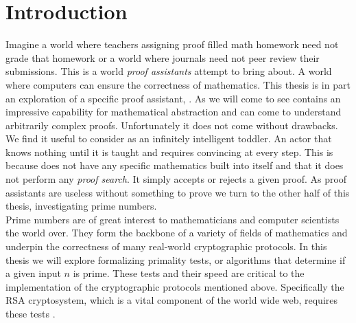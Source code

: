 \documentclass[./Thesis.tex]{subfiles}
\begin{document}
\chapter{Introduction}
\label{chap:Introduction}
Imagine a world where teachers assigning proof filled math homework need not
grade that homework or a world where journals need not peer review their
submissions. This is a world \textit{proof assistants} attempt to bring about. A world
where computers can ensure the correctness of mathematics. This thesis is in
part an exploration of a specific proof assistant, \Agda{} \cite{agda}. As we
will come to see \Agda{} contains an impressive capability for mathematical
abstraction and can come to understand arbitrarily complex proofs. Unfortunately
it does not come without drawbacks. We find it useful to consider \Agda{} as an
infinitely intelligent toddler. An actor that knows nothing until it is taught
and requires convincing at every step. This is because \Agda{} does not have any
specific mathematics built into itself and that it does not perform any
\textit{proof search}. It simply accepts or rejects a given proof. As proof
assistants are useless without something to prove we turn to the other half of
this thesis, investigating prime numbers. \\

Prime numbers are of great interest to mathematicians and computer scientists
the world over. They form the backbone of a variety of fields of mathematics and
underpin the correctness of many real-world cryptographic protocols. In this
thesis we will explore formalizing primality tests, or algorithms that determine
if a given input $n$ is prime. These tests and their speed are critical to the
implementation of the cryptographic protocols mentioned above. Specifically the RSA
cryptosystem, which is a vital component of the world wide web, requires these
tests \cite{rsa}.
\end{document}
